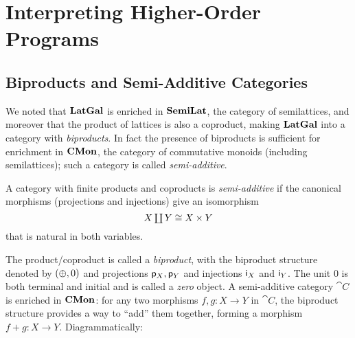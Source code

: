 \section{Interpreting Higher-Order Programs}


\subsection{Biproducts and Semi-Additive Categories}
\label{sec:biproducts}

We noted that $\mathbf{LatGal}$ is enriched in $\mathbf{SemiLat}$, the category of semilattices, and moreover that the product
of lattices is also a coproduct, making $\mathbf{LatGal}$ into a category with \emph{biproducts}. In fact the presence
of biproducts is sufficient for enrichment in $\mathbf{CMon}$, the category of commutative monoids (including
semilattices); such a category is called \emph{semi-additive}.

\begin{definition}
\label{def:biproducts:semi-additive}
A category with finite products and coproducts is \emph{semi-additive} if the canonical morphisms (projections
and injections) give an isomorphism
\[\textstyle X \coprod Y \cong X \times Y\] that is natural in both variables.
\end{definition}

The product/coproduct is called a \emph{biproduct}, with the biproduct structure denoted by $(\oplus, 0)$ and
projections $\mathsf{p}_X, \mathsf{p}_Y$ and injections $\mathsf{i}_X$ and $\mathsf{i}_Y$. The unit $0$ is both terminal and
initial and is called a \emph{zero} object. A semi-additive category $\cat{C}$ is enriched in $\mathbf{CMon}$: for any
two morphisms $f, g: X \to Y$ in $\cat{C}$, the biproduct structure provides a way to ``add'' them together,
forming a morphism $f + g: X \to Y$. Diagrammatically:

\begin{center}
\end{center}


